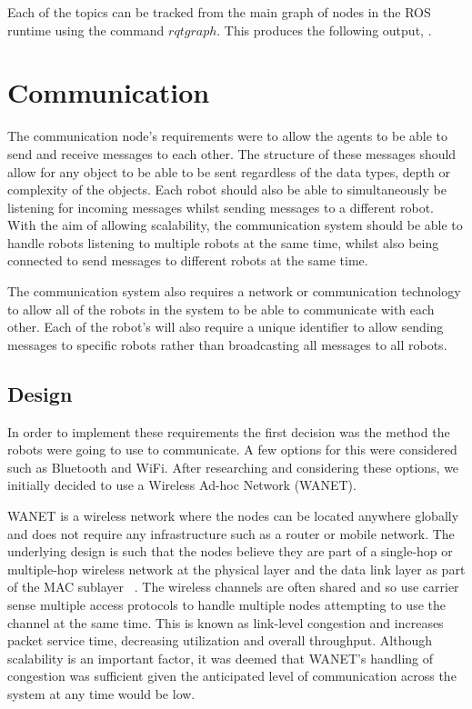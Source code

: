Each of the topics can be tracked from the main graph of nodes in the ROS runtime using the command $rqt graph$. This produces the following output, . 


\section{Communication}\label{soft/comms}
The communication node's requirements were to allow the agents to 
be able to send and receive messages to each other. The structure 
of these messages should allow for any object to be able to be sent 
regardless of the data types, depth or complexity of the objects. 
Each robot should also be able to simultaneously be listening for 
incoming messages whilst sending messages to a different robot. 
With the aim of allowing scalability, the communication system 
should be able to handle robots listening to multiple robots at the 
same time, whilst also being connected to send messages to different 
robots at the same time. 

The communication system also requires a network or communication 
technology to allow all of the robots in the system to be able to 
communicate with each other. Each of the robot's will also require 
a unique identifier to allow sending messages to specific robots 
rather than broadcasting all messages to all robots. 

\subsection{Design}\label{soft/comms/design}
In order to implement these requirements the first decision was the 
method the robots were going to use to communicate. A few options 
for this were considered such as Bluetooth and WiFi. After 
researching  and considering these options, we initially decided to 
use a Wireless Ad-hoc Network (WANET). 

WANET is a wireless network where the nodes can be located anywhere 
globally and does not require any infrastructure such as a router or 
mobile network. The underlying design is such that the nodes believe 
they are part of a single-hop or multiple-hop wireless network at the 
physical layer and the data link layer as part of the MAC sublayer~
\cite{rajesh2015congestion}. The wireless channels are often shared 
and so use carrier sense multiple access protocols to handle multiple 
nodes attempting to use the channel at the same time. This is known 
as link-level congestion and increases packet service time, 
decreasing utilization and overall throughput. Although scalability 
is an important  factor, it was deemed that WANET's handling of 
congestion was sufficient given the anticipated level of 
communication across the system at any time would be low. 

